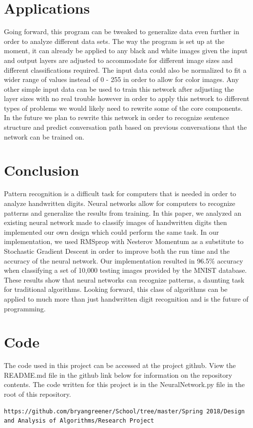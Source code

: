 \documentclass[12pt]{article}
\theoremstyle{definition}
\theoremstyle{plain}
\begin{document}
\section{Applications}
Going forward, this program can be tweaked to generalize data even further in order to analyze different data sets. The way the program is set up at the moment, it can already be applied to any black and white images given the input and output layers are adjusted to accommodate for different image sizes and different classifications required. The input data could also be normalized to fit a wider range of values instead of 0 \-- 255 in order to allow for color images. Any other simple input data can be used to train this network after adjusting the layer sizes with no real trouble however in order to apply this network to different types of problems we would likely need to rewrite some of the core components. In the future we plan to rewrite this network in order to recognize sentence structure and predict conversation path based on previous conversations that the network can be trained on.

\section{Conclusion}
Pattern recognition is a difficult task for computers that is needed in order to analyze handwritten digits. Neural networks allow for computers to recognize patterns and generalize the results from training. In this paper, we analyzed an existing neural network made to classify images of handwritten digits then implemented our own design which could perform the same task. In our implementation, we used RMSprop with Nesterov Momentum\cite{readthedocs,ruder_2016} as a substitute to Stochastic Gradient Descent in order to improve both the run time and the accuracy of the neural network. Our implementation resulted in 96.5\% accuracy when classifying a set of 10,000 testing images provided by the MNIST database. These results show that neural networks can recognize patterns, a daunting task for traditional algorithms. Looking forward, this class of algorithms can be applied to much more than just handwritten digit recognition and is the future of programming.

\nocite{*}
\printbibliography

\section*{Code}
The code used in this project can be accessed at the project github. View the README.md file in the github link below for information on the repository contents. The code written for this project is in the NeuralNetwork.py file in the root of this repository.
\begin{center}
\texttt{https://github.com/bryangreener/School/tree/master/Spring 2018/Design and Analysis of Algorithms/Research Project}
\end{center}
\end{document}
